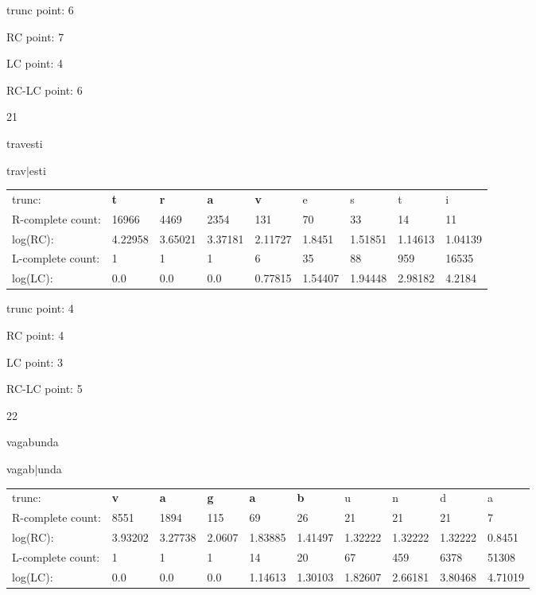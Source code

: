 \documentclass{article}
\begin{document}
trunc point: 6

RC point: 7

LC point: 4

RC-LC point: 6

\vspace{3em}



21

travesti

trav$|$esti

\vspace{1em}

\begin{tabular}{l|llllllll}

trunc: & {\color{red}\bf t} & {\color{red}\bf r} & {\color{red}\bf a} & {\color{red}\bf v} & e & s & t & i \\ 
R-complete count: & 16966 & 4469 & 2354 & 131 & 70 & 33 & 14 & 11 \\ 
log(RC): & 4.22958 & 3.65021 & 3.37181 & 2.11727 & 1.8451 & 1.51851 & 1.14613 & 1.04139 \\ 
L-complete count: & 1 & 1 & 1 & 6 & 35 & 88 & 959 & 16535 \\ 
log(LC): & 0.0 & 0.0 & 0.0 & 0.77815 & 1.54407 & 1.94448 & 2.98182 & 4.2184 \\ 
\end{tabular}

trunc point: 4

RC point: 4

LC point: 3

RC-LC point: 5

\vspace{3em}



22

vagabunda

vagab$|$unda

\vspace{1em}

\begin{tabular}{l|lllllllll}

trunc: & {\color{red}\bf v} & {\color{red}\bf a} & {\color{red}\bf g} & {\color{red}\bf a} & {\color{red}\bf b} & u & n & d & a \\ 
R-complete count: & 8551 & 1894 & 115 & 69 & 26 & 21 & 21 & 21 & 7 \\ 
log(RC): & 3.93202 & 3.27738 & 2.0607 & 1.83885 & 1.41497 & 1.32222 & 1.32222 & 1.32222 & 0.8451 \\ 
L-complete count: & 1 & 1 & 1 & 14 & 20 & 67 & 459 & 6378 & 51308 \\ 
log(LC): & 0.0 & 0.0 & 0.0 & 1.14613 & 1.30103 & 1.82607 & 2.66181 & 3.80468 & 4.71019 \\ 
\end{tabular}
\end{document}
